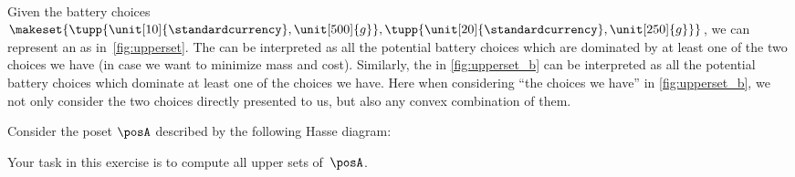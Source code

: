 \begin{marginfigure}
    \\
    \caption{}
\end{marginfigure}
%

Given the battery choices~$\makeset{\tupp{\unit[10]{\standardcurrency},\unit[500]{g}}, \tupp{\unit[20]{\standardcurrency},\unit[250]{g}}}$, we can represent an  as in~\cref{fig:upperset}.
The  can be interpreted as all the potential battery choices which are dominated by at least one of the two choices we have (in case we want to minimize mass and cost).
Similarly, the  in \cref{fig:upperset_b} can be interpreted as all the potential battery choices which dominate at least one of the choices we have.
Here when considering ``the choices we have'' in \cref{fig:upperset_b}, we not only consider the two choices directly presented to us, but also any convex combination of them.


\begin{gradedexercise}
    \label{ex:UpperSetsOfPreferences}

    Consider the poset $\posA$ described by the following Hasse diagram:
    \begin{center}
    \end{center}
    Your task in this exercise is to compute all upper sets of~$\posA$.
\end{gradedexercise}

